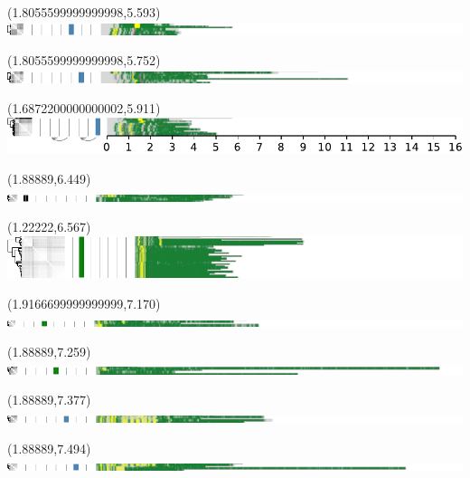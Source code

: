 \documentclass{article}
\begin{document}
\begin{textblock}{13}(1.8055599999999998,5.593)\includegraphics{./Figure_S5/chr11-HG005.pdf}\end{textblock}
\begin{textblock}{13}(1.8055599999999998,5.752)\includegraphics{./Figure_S5/chr11-HG006.pdf}\end{textblock}
\begin{textblock}{13}(1.6872200000000002,5.911)\includegraphics{./Figure_S5/chr11-HG007.pdf}\end{textblock}
\begin{textblock}{13}(1.88889,6.449)\includegraphics{./Figure_S5/chr12-HG001.pdf}\end{textblock}
\begin{textblock}{13}(1.22222,6.567)\includegraphics{./Figure_S5/chr12-HG002.pdf}\end{textblock}
\begin{textblock}{13}(1.9166699999999999,7.170)\includegraphics{./Figure_S5/chr12-HG003.pdf}\end{textblock}
\begin{textblock}{13}(1.88889,7.259)\includegraphics{./Figure_S5/chr12-HG004.pdf}\end{textblock}
\begin{textblock}{13}(1.88889,7.377)\includegraphics{./Figure_S5/chr12-HG005.pdf}\end{textblock}
\begin{textblock}{13}(1.88889,7.494)\includegraphics{./Figure_S5/chr12-HG006.pdf}\end{textblock}
\end{document}
